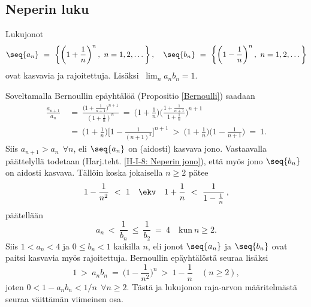 \pagebreak

\subsection{Neperin luku}
%

\begin{Prop} \label{Neperin jonot} Lukujonot 
\[
\seq{a_n}\ =\ \left\{\left(1 + \frac{1}{n}\right)^n,\ n = 1,2, \ldots\,\right\}, \quad 
\seq{b_n}\ =\ \left\{\left(1 - \frac{1}{n}\right)^n,\ n = 1,2, \ldots\,\right\} 
\]
ovat kasvavia ja rajoitettuja. Lisäksi $\ \lim_n a_n b_n = 1$. \end{Prop}
\tod Soveltamalla Bernoullin epäyhtälöä (Propositio \ref{Bernoulli}) saadaan
\begin{align*}
\frac{a_{n+1}}{a_n}\ &=\ \frac{\bigl(1 + \frac{1}{n+1}\bigr)^{n+1}}{(1 + \frac{1}{n})^n}\
                      =\ \biggl(1 + \frac{1}{n}\biggr) 
                         \Biggl( \frac{1 + \frac{1}{n+1}}{1 + \frac{1}{n}} \Biggr)^{n+1} \\
                     &=\ \biggl(1 + \frac{1}{n}\biggr) 
                         \Biggl[ 1 - \frac{1}{(n+1)^2} \Biggr]^{n+1}\ 
                      >\ \biggl(1 + \frac{1}{n}\biggr)\biggl(1 - \frac{1}{n+1}\biggr)\ =\ 1.
\end{align*}
Siis $a_{n+1} > a_n\ \ \forall n$, eli $\seq{a_n}$ on (aidosti) kasvava jono. Vastaavalla 
päättelyllä todetaan (Harj.teht. \ref{H-I-8: Neperin jono}), että myös jono $\seq{b_n}$ on 
aidosti kasvava. Tällöin koska jokaisella $n \ge 2$ pätee
\[
1 - \frac{1}{n^2}\ <\ 1 \quad \ekv \quad 1 + \frac{1}{n}\ <\ \frac{1}{1-\frac{1}{n}}\,,
\]
päätellään
\[
a_n\ <\ \frac{1}{b_n}\ \le\ \frac{1}{b_2}\ =\ 4 \quad \text{kun}\ n \ge 2.
\]
Siis $1 < a_n < 4$ ja $0 \le b_n < 1$ kaikilla $n$, eli jonot $\seq{a_n}$ ja $\seq{b_n}$ ovat
paitsi kasvavia myös rajoitettuja. Bernoullin epäyhtälöstä seuraa lisäksi
\[
1\ >\ a_n b_n\ =\ \bigl(1 - \frac{1}{n^2}\bigr)^n\ >\ 1 - \frac{1}{n} \quad (n \ge 2),
\]
joten $0 < 1 - a_n b_n < 1/n\ \ \forall n \ge 2$. Tästä ja lukujonon raja-arvon määritelmästä
seuraa väittämän viimeinen osa. \loppu  


